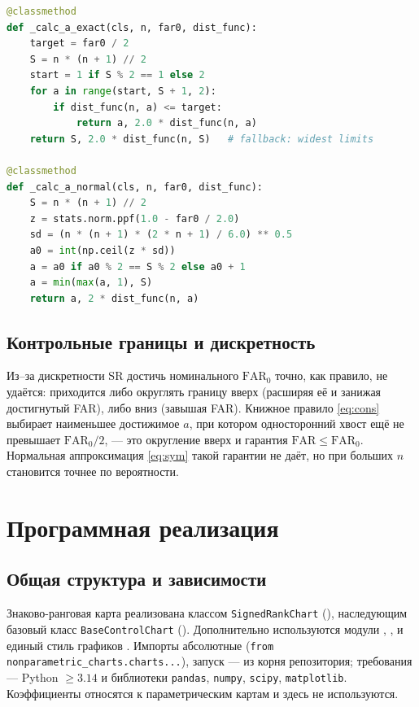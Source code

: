 \documentclass[11pt,a4paper]{article}
\newcommand{\SR}{\mathrm{SR}}
\newcommand{\FAR}{\mathrm{FAR}}
\newcommand{\FARz}{\mathrm{FAR}_0}
\begin{document}
\begin{lstlisting}[language=Python]
@classmethod
def _calc_a_exact(cls, n, far0, dist_func):
    target = far0 / 2
    S = n * (n + 1) // 2
    start = 1 if S % 2 == 1 else 2
    for a in range(start, S + 1, 2):
        if dist_func(n, a) <= target:
            return a, 2.0 * dist_func(n, a)
    return S, 2.0 * dist_func(n, S)   # fallback: widest limits

@classmethod
def _calc_a_normal(cls, n, far0, dist_func):
    S = n * (n + 1) // 2
    z = stats.norm.ppf(1.0 - far0 / 2.0)
    sd = (n * (n + 1) * (2 * n + 1) / 6.0) ** 0.5
    a0 = int(np.ceil(z * sd))
    a = a0 if a0 % 2 == S % 2 else a0 + 1
    a = min(max(a, 1), S)
    return a, 2 * dist_func(n, a)
\end{lstlisting}

\subsection{Контрольные границы и дискретность}
\label{sec:sr-discrete}

Из--за дискретности $\SR$ достичь номинального $\FARz$ точно, как правило,
не удаётся: приходится либо округлять границу вверх (расширяя её и занижая
достигнутый FAR), либо вниз (завышая FAR). Книжное правило
\eqref{eq:cons} выбирает наименьшее достижимое $a$, при котором
односторонний хвост ещё не превышает $\FARz/2$, --- это округление вверх и
гарантия $\FAR\le\FARz$. Нормальная аппроксимация \eqref{eq:sym} такой
гарантии не даёт, но при больших $n$ становится точнее по вероятности.

\section{Программная реализация}
\label{sec:impl}

\subsection{Общая структура и зависимости}
\label{sec:impl-struct}

Знаково-ранговая карта реализована классом \texttt{SignedRankChart}
(), наследующим базовый класс
\texttt{BaseControlChart} (). Дополнительно
используются модули ,
,  и единый
стиль графиков . Импорты абсолютные
(\texttt{from nonparametric\_charts.charts...}), запуск --- из корня репозитория; требования
--- Python $\ge3.14$ и библиотеки \texttt{pandas}, \texttt{numpy},
\texttt{scipy}, \texttt{matplotlib}. Коэффициенты
 относятся к параметрическим картам и здесь не
используются.
\end{document}
